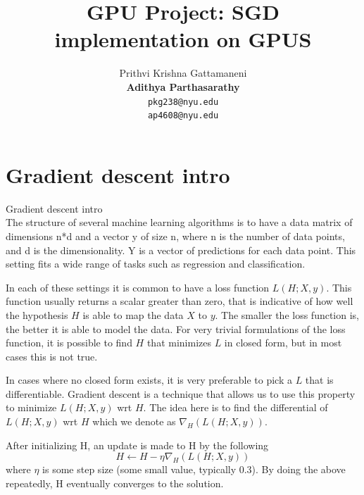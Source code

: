 \documentclass{article}
\title{GPU Project: SGD implementation on GPUS}
\author{
  Prithvi Krishna Gattamaneni\\
  \textbf{Adithya Parthasarathy}\\
  \texttt{pkg238@nyu.edu} \\
  \texttt{ap4608@nyu.edu}
}
\begin{document}
\maketitle

\section{Gradient descent intro} %
Gradient descent intro\\
The structure of several machine learning algorithms is to have a data matrix of dimensions n*d and a vector y of size n, where n is the number of data points, and d is the dimensionality. Y is a vector of predictions for each data point. This setting fits a wide range of tasks such as regression and classification. 


In each of these settings it is common to have a loss function $L(H;X,y)$. This function usually returns a scalar greater than zero, that is indicative of how well the hypothesis $H$ is able to map the data $X$ to $y$. The smaller the loss function is, the better it is able to model the data. For very trivial formulations of the loss function, it is possible to find $H$ that minimizes $L$ in closed form, but in most cases this is not true. 


In cases where no closed form exists, it is very preferable to pick a $L$ that is differentiable. Gradient descent is a technique that allows us to use this property to minimize $L(H;X,y)$ wrt $H$. The idea here is to find the differential of $L(H;X,y)$ wrt $H$ which we denote as $\nabla_{H}(L(H;X,y))$.

After initializing H, an update is made to H by the following
$$H \leftarrow H - \eta \nabla_{H}(L(H;X,y))$$
where $\eta$ is some step size (some small value, typically 0.3). By doing the above repeatedly, H eventually converges to the solution.
\end{document}
